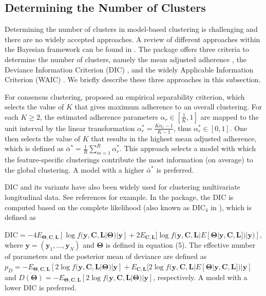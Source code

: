 \subsection{Determining the Number of Clusters}

Determining the number of clusters in model-based clustering is challenging and there are no widely accepted approaches. A review of different approaches within the Bayesian framework can be found in \citet{Celeux2006, Nasserinejad2017,Merkle2019}. The  package offers three criteria to determine the number of clusters, namely the mean adjusted adherence \citep{Lock2013}, the Deviance Information Criterion (DIC) \citep{Spiegelhalter2002, Celeux2006}, and the widely Applicable Information Criterion (WAIC) \citep{Watanabe2010, Gelman2014a}. We briefly describe these three approaches in this subsection. 

For consensus clustering, \citet{Lock2013} proposed an empirical separability criterion, which selects the value of $K$ that gives maximum adherence to an overall clustering. For each $K \ge 2$, the estimated adherence parameters $\alpha_r \in [\frac{1}{K},1]$ are mapped to the unit interval by the linear transformation  $\alpha^{*}_r = \frac{K\alpha_r - 1}{K-1}$, thus $\alpha^{*}_r \in [0,1]$. One then selects the value of $K$ that results in the highest mean adjusted adherence, which is defined as $ \bar{\alpha}^{*} = \frac{1}{R}\sum_{m=1}^R \alpha^{*}_r$.  This approach selects a model with which the feature-specific clusterings contribute the most information (on average) to the global clustering. A model with a higher $\bar{\alpha}^{*}$ is preferred.

DIC and its variants have also been widely used for clustering multivariate longitudinal data. See references \citep{Lu2019, Neelon2011, Leiby2009,Elliott2005,Fruehwirth-Schnatter2010} for example. In the  package, the DIC is computed based on the complete likelihood (also known as $\text{DIC}_4$ in \citet{Celeux2006}), which is defined as

$ \text{DIC} = -4E_{\boldsymbol{\Theta},\boldsymbol{C},\boldsymbol{L}} [\log f(\boldsymbol{y},\boldsymbol{C},\boldsymbol{L}|\boldsymbol{\Theta})|\boldsymbol{y}]+ 2E_{\boldsymbol{C},\boldsymbol{L}}[\log f(\boldsymbol{y},\boldsymbol{C},\boldsymbol{L}|E[\boldsymbol{\Theta}|\boldsymbol{y},\boldsymbol{C},\boldsymbol{L}])|\boldsymbol{y})]$, where $\boldsymbol{y} = (\boldsymbol{y}_1, ..., \boldsymbol{y}_N)$ and $\boldsymbol{\Theta}$ is defined in equation (5). The effective number of parameters and the posterior mean of deviance are defined as $p_D = - E_{\boldsymbol{\Theta},\boldsymbol{C},\boldsymbol{L}}[2\log f(\boldsymbol{y},\boldsymbol{C},\boldsymbol{L}|\boldsymbol{\Theta})|\boldsymbol{y}] +  E_{\boldsymbol{C},\boldsymbol{L}}[2\log f(\boldsymbol{y},\boldsymbol{C},\boldsymbol{L}|E[\boldsymbol{\Theta}|\boldsymbol{y},\boldsymbol{C},\boldsymbol{L}])|\boldsymbol{y}]$ and $\overline{D(\boldsymbol{\Theta})} = -E_{\boldsymbol{\Theta},\boldsymbol{C},\boldsymbol{L}}[2\log f(\boldsymbol{y},\boldsymbol{C},\boldsymbol{L}|\boldsymbol{\Theta})|\boldsymbol{y}]$, respectively. A model with a lower DIC is preferred. 

